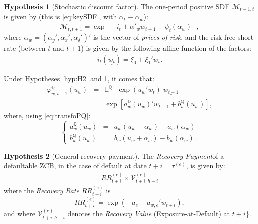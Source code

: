\documentclass[
  12pt,
]{book}
\theoremstyle{definition}
\theoremstyle{definition}
\theoremstyle{definition}
\theoremstyle{definition}
\newtheorem{hypothesis}{Hypothesis}[chapter]
\theoremstyle{remark}
\begin{document}
\begin{hypothesis}[Stochastic discount factor]
\protect\hypertarget{hyp:H4}{}\label{hyp:H4}The one-period positive SDF \(\mathcal{M}_{t-1, t}\) is given by (this is \eqref{eq:keySDF}, with \(\alpha_t \equiv \alpha_w\)):
\begin{equation}
\mathcal{M}_{t,t+1} = \exp[-i_{t}+\alpha'_w w_{t+1}-\psi_t(\alpha_w)],
\end{equation}
where \(\alpha_w = (\alpha_y ' , \alpha_x ' , \alpha_{\delta} ') '\) is the vector of \emph{prices of risk}, and the risk-free short rate (between \(t\) and \(t+1\)) is given by the following affine function of the factors:
\begin{equation}
\begin{array}{lll}
i_{t}(\underline{w_{t}}) = \xi_0 + \xi_1 ' w_{t}.
\end{array}\label{eq:shortrate}
\end{equation}
\end{hypothesis}

Under Hypotheses \ref{hyp:H2} and \ref{hyp:H4}, it comes that:
\begin{eqnarray}
\varphi^{\mathbb{Q}}_{w, t-1} (u_w) &=& \mathbb{E}^{\mathbb{Q}} \left[\exp( u_w ' w_t )   |   \underline{w_{t-1}} \right] \nonumber \\
&=& \exp \left[ a^{\mathbb{Q}}_{w} (u_{w}) ' w_{t-1} + b^{\mathbb{Q}}_{w} (u_{w}) \right],\label{eq:affineQcLT}
\end{eqnarray}
where, using \eqref{eq:transfoPQ}:
\begin{equation}
\left\{
\begin{array}{ccl}
a^{\mathbb{Q}}_{w} (u_{w}) &=& a_{w} (u_{w} + \alpha_w) - a_{w} (\alpha_w) \\
b^{\mathbb{Q}}_{w} (u_{w}) &=& b_{w} (u_{w} + \alpha_w) - b_{w} (\alpha_w).
\end{array}
\right.\label{eq:aQbQ}
\end{equation}

\begin{hypothesis}[General recovery payment]
\protect\hypertarget{hyp:RRvalue}{}\label{hyp:RRvalue}The \emph{Recovery Payment}of a defaultable ZCB, in the case of default at date \(t+i = \tau^{(e)}\), is given by:
\begin{equation}
\begin{array}{lll}
RR^{(e)}_{t+i}   \times   \mathcal{V}^{(e)}_{t+i, h-i}
\end{array}\label{eq:recoverypaym}
\end{equation}
where the \emph{Recovery Rate} \(RR^{(e)}_{t+i}\) is
\begin{equation}
RR^{(e)}_{t+i} = \exp \left( - a_{e} - a_{w, e} '   w_{t+i} \right),\label{eq:recoveryrate2}
\end{equation}
and where \(\mathcal{V}^{(e)}_{t+i, h-i}\) denotes the \emph{Recovery Value} (Exposure-at-Default) at \(t+i\)\}.
\end{hypothesis}
\end{document}
